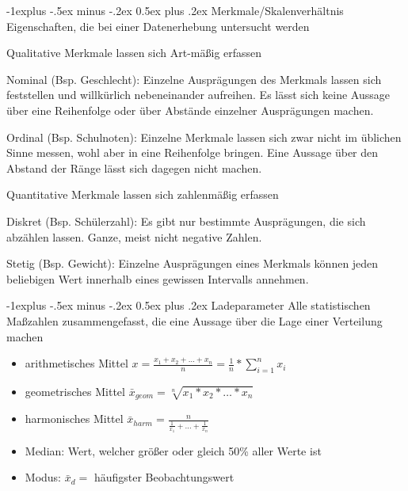 \documentclass[a4paper]{article}
\makeatletter
\renewcommand{\subsection}{\@startsection{subsection}{2}{0mm}%
                                {-1explus -.5ex minus -.2ex}%
                                {0.5ex plus .2ex}%
                                {\normalfont\normalsize\bfseries}}
\makeatother
\begin{document}
\begin{multicols}{3}
  \subsection{Merkmale/Skalenverhältnis}
  Eigenschaften, die bei einer Datenerhebung untersucht werden
  \begin{description*}
    \item[Qualitative] Merkmale lassen sich Art-mäßig erfassen
    \begin{description*}
      \item[Nominal] (Bsp. Geschlecht): Einzelne Ausprägungen des Merkmals lassen sich feststellen und willkürlich nebeneinander aufreihen. Es lässt sich keine Aussage über eine Reihenfolge oder über Abstände einzelner Ausprägungen machen.
      \item[Ordinal] (Bsp. Schulnoten): Einzelne Merkmale lassen sich zwar nicht im üblichen Sinne messen, wohl aber in eine Reihenfolge bringen. Eine Aussage über den Abstand der Ränge lässt sich dagegen nicht machen.
    \end{description*}
    \item[Quantitative] Merkmale lassen sich zahlenmäßig erfassen
    \begin{description*}
      \item[Diskret] (Bsp. Schülerzahl): Es gibt nur bestimmte Ausprägungen, die sich abzählen lassen. Ganze, meist nicht negative Zahlen.
      \item[Stetig] (Bsp. Gewicht): Einzelne Ausprägungen eines Merkmals können jeden beliebigen Wert innerhalb eines gewissen Intervalls annehmen.
    \end{description*}
  \end{description*}

  \subsection{Ladeparameter}
  Alle statistischen Maßzahlen zusammengefasst, die eine Aussage über die Lage einer Verteilung machen
  \begin{itemize}
    \item arithmetisches Mittel $x=\frac{x_1+x_2+\dots+x_n}{n}=\frac{1}{n}*\sum_{i=1}^n x_i$
    \item geometrisches Mittel $\bar{x}_{geom} = \sqrt[n]{x_1*x_2*\dots*x_n}$
    \item harmonisches Mittel $\bar{x}_{harm} = \frac{n}{\frac{1}{x_1}+\dots+\frac{1}{x_n}}$
    \item Median: Wert, welcher größer oder gleich 50\% aller Werte ist
    \item Modus: $\bar{x}_d=$ häufigster Beobachtungswert
  \end{itemize}


\end{multicols}
\end{document}
